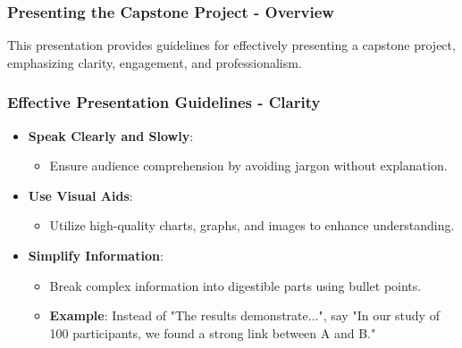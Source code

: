 \documentclass[aspectratio=169]{beamer}
\begin{document}
\begin{frame}[fragile]
    \frametitle{Presenting the Capstone Project - Overview}
    This presentation provides guidelines for effectively presenting a capstone project, emphasizing clarity, engagement, and professionalism.
\end{frame}

\begin{frame}[fragile]
    \frametitle{Effective Presentation Guidelines - Clarity}
    \begin{itemize}
        \item \textbf{Speak Clearly and Slowly}:
        \begin{itemize}
            \item Ensure audience comprehension by avoiding jargon without explanation.
        \end{itemize}
        \item \textbf{Use Visual Aids}:
        \begin{itemize}
            \item Utilize high-quality charts, graphs, and images to enhance understanding.
        \end{itemize}
        \item \textbf{Simplify Information}:
        \begin{itemize}
            \item Break complex information into digestible parts using bullet points.
            \item \textbf{Example}: Instead of "The results demonstrate...", say "In our study of 100 participants, we found a strong link between A and B."
        \end{itemize}
    \end{itemize}
\end{frame}
\end{document}
